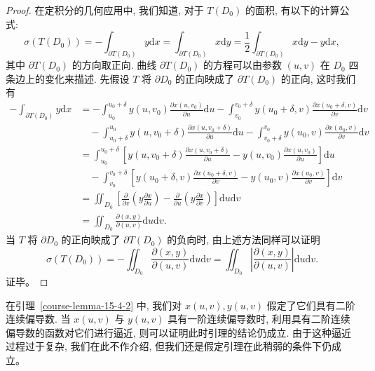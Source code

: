 \documentclass[UTF8,12pt,a4paper,fontset=fandol]{ctexart}
\begin{document}
\begin{proof}\quad 在定积分的几何应用中, 我们知道, 对于 $T(D_0)$ 的面积, 有以下的计算公式:
\[
  \sigma(T(D_0))=-\int_{\partial T(D_0)}y\mathrm dx
  =\int_{\partial T(D_0)}x\mathrm dy
  =\frac12\int_{\partial T(D_0)}x\mathrm dy-y\mathrm dx,
\]
其中 $\partial T(D_0)$ 的方向取正向. 曲线 $\partial T(D_0)$ 的方程可以由参数 $(u,v)$ 在 $D_0$ 四条边上的变化来描述. 先假设 $T$ 将 $\partial D_0$ 的正向映成了 $\partial T(D_0)$ 的正向, 这时我们有
\[
\begin{aligned}
  -\int_{\partial T(D_0)}y\mathrm dx
  &=-\int_{u_0}^{u_0+\delta}y(u,v_0)\frac{\partial x(u,v_0)}{\partial u}\mathrm du
    -\int_{v_0}^{v_0+\delta}y(u_0+\delta,v)\frac{\partial x(u_0+\delta,v)}{\partial v}\mathrm dv\\
  &\quad-\int_{u_0+\delta}^{u_0}y(u,v_0+\delta)\frac{\partial x(u,v_0+\delta)}{\partial u}\mathrm du
    -\int_{v_0+\delta}^{v_0}y(u_0,v)\frac{\partial x(u_0,v)}{\partial v}\mathrm dv\\
  &=\int_{u_0}^{u_0+\delta}
    \left[y(u,v_0+\delta)\frac{\partial x(u,v_0+\delta)}{\partial u}
    -y(u,v_0)\frac{\partial x(u,v_0)}{\partial u}\right]\mathrm du\\
  &\quad-\int_{v_0}^{v_0+\delta}
    \left[y(u_0+\delta,v)\frac{\partial x(u_0+\delta,v)}{\partial v}
    -y(u_0,v)\frac{\partial x(u_0,v)}{\partial v}\right]\mathrm dv\\
  &=\iint_{D_0}\left[
    \frac{\partial}{\partial v}\left(y\frac{\partial x}{\partial u}\right)
    -\frac{\partial}{\partial u}\left(y\frac{\partial x}{\partial v}\right)
    \right]\mathrm du\mathrm dv\\
  &=\iint_{D_0}\frac{\partial(x,y)}{\partial(u,v)}\mathrm du\mathrm dv.
\end{aligned}
\]
当 $T$ 将 $\partial D_0$ 的正向映成了 $\partial T(D_0)$ 的负向时, 由上述方法同样可以证明
\[
  \sigma(T(D_0))=-\iint_{D_0}\frac{\partial(x,y)}{\partial(u,v)}\mathrm du\mathrm dv
  =\iint_{D_0}\left|\frac{\partial(x,y)}{\partial(u,v)}\right|\mathrm du\mathrm dv.
\]
证毕。

\end{proof}
\begin{remark}\quad 在引理~\ref{course-lemma-15-4-2}  中, 我们对 $x(u,v),y(u,v)$ 假定了它们具有二阶连续偏导数. 当 $x(u,v)$ 与 $y(u,v)$ 具有一阶连续偏导数时, 利用具有二阶连续偏导数的函数对它们进行逼近, 则可以证明此时引理的结论仍成立. 由于这种逼近过程过于复杂, 我们在此不作介绍, 但我们还是假定引理在此稍弱的条件下仍成立。

\end{remark}
\end{document}

